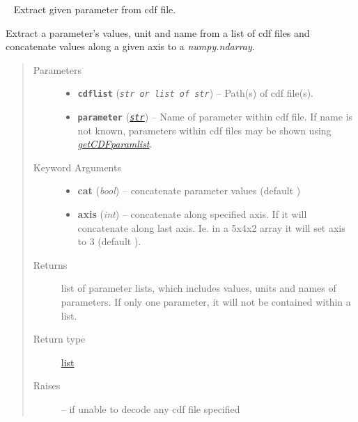 \documentclass[letterpaper,10pt,english]{sphinxhowto}
\begin{document}
\begin{fulllineitems}
\label{swtools_doc:swtools.extract_parameter}~\label{swtools_doc:extract-parameter}
Extract given parameter from cdf file.

Extract a parameter's values, unit and name from a list of cdf
files and concatenate values along a given axis to a
\emph{numpy.ndarray}.
\begin{quote}\begin{description}
\item[{Parameters}] \leavevmode\begin{itemize}
\item {} 
\textbf{\texttt{cdflist}} (\emph{\texttt{str or list of str}}) -- Path(s) of cdf file(s).

\item {} 
\textbf{\texttt{parameter}} (\href{https://docs.python.org/library/functions.html\#str}{\emph{\texttt{str}}}) -- Name of parameter within cdf file. If name is not known,
parameters within cdf files may be shown using
{\hyperref[swtools_doc:getcdfparamlist]{\emph{getCDFparamlist}}}.

\end{itemize}

\item[{Keyword Arguments}] \leavevmode\begin{itemize}
\item {} 
\textbf{cat} (\emph{bool}) --
concatenate parameter values (default )

\item {} 
\textbf{axis} (\emph{int}) --
concatenate along specified axis. If  it will
concatenate along last axis. Ie. in a 5x4x2 array it will set
axis to 3 (default ).

\end{itemize}

\item[{Returns}] \leavevmode
list of parameter lists, which includes values, units and names
of parameters. If only one parameter, it will not be contained
within a list.

\item[{Return type}] \leavevmode
\href{https://docs.python.org/library/functions.html\#list}{list}

\item[{Raises}] \leavevmode
{} --
if unable to decode any cdf file specified

\end{description}\end{quote}

\end{fulllineitems}
\end{document}
